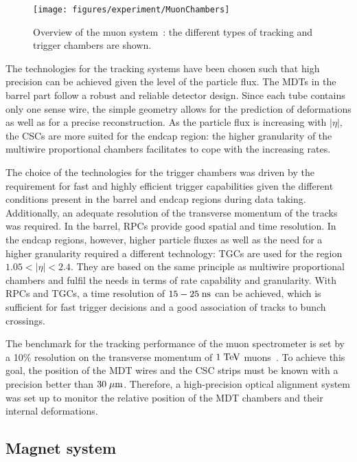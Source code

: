 \begin{figure}[h]
\begin{center}
\texttt{[image: figures/experiment/MuonChambers]}
\caption[Overview of the muon system]{
  Overview of the muon system~\cite{detectorpaper}:
  the different types of tracking and trigger chambers are shown.}
\label{fig:muons}
\end{center}
\end{figure}

The technologies for the tracking systems have been chosen such that high precision can be achieved given the level of the particle flux.
The MDTs in the barrel part follow a robust and reliable detector design.
Since each tube contains only one sense wire, the simple geometry allows for the prediction of deformations as well as for a precise reconstruction.
As the particle flux is increasing with $|\eta|$, the CSCs are more suited for the endcap region:
the higher granularity of the multiwire proportional chambers facilitates to cope with the increasing rates.

The choice of the technologies for the trigger chambers was driven by the requirement for fast and highly efficient trigger capabilities
given the different conditions present in the barrel and endcap regions during data taking.
Additionally, an adequate resolution of the transverse momentum of the tracks was required.
In the barrel, RPCs provide good spatial and time resolution.
In the endcap regions, however, higher particle fluxes as well as the need for a higher granularity required a different
technology: TGCs are used for the region \mbox{$1.05 < |\eta| < 2.4$}.
They are based on the same principle as multiwire proportional chambers and fulfil the needs in terms of rate capability and granularity.
With RPCs and TGCs, a time resolution of \mbox{$15 - 25 \; \mathrm{ns}$} can be achieved, which is sufficient for fast trigger decisions and a good association of
tracks to bunch crossings.

The benchmark for the tracking performance of the muon spectrometer is set by a 10\% resolution on the transverse momentum of \mbox{$1 \; \mathrm{TeV}$}
muons~\cite{detectorpaper}.
To achieve this goal, the position of the MDT wires and the CSC strips must be known with a precision better than \mbox{$30 \; \mu\mathrm{m}$}.
Therefore, a high-precision optical alignment system was set up to monitor the relative position of the MDT chambers and their internal deformations.

\subsection{Magnet system}
\label{sec:magnets}


